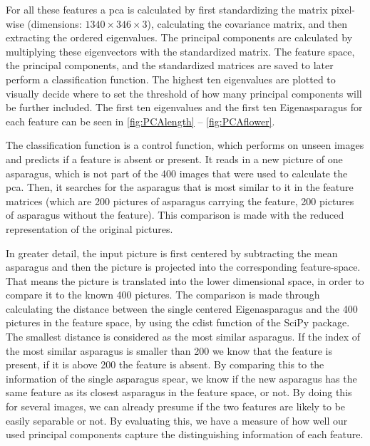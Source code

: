 
\bigskip
For all these features a \acrshort{pca} is calculated by first standardizing the matrix pixel-wise (dimensions: $1340\times346\times3$), calculating the covariance matrix, and then extracting the ordered eigenvalues. The principal components are calculated by multiplying these eigenvectors with the standardized matrix. The feature space, the principal components, and the standardized matrices are saved to later perform a classification function. The highest ten eigenvalues are plotted to visually decide where to set the threshold of how many principal components will be further included. The first ten eigenvalues and the first ten Eigenasparagus for each feature can be seen in \autoref{fig:PCAlength} -- \autoref{fig:PCAflower}.

The classification function is a control function, which performs on unseen images and predicts if a feature is absent or present. It reads in a new picture of one asparagus, which is not part of the 400 images that were used to calculate the \acrshort{pca}. Then, it searches for the asparagus that is most similar to it in the feature matrices (which are 200 pictures of asparagus carrying the feature, 200 pictures of asparagus without the feature). This comparison is made with the reduced representation of the original pictures.

In greater detail, the input picture is first centered by subtracting the mean asparagus and then the picture is projected into the corresponding feature-space. That means the picture is translated into the lower dimensional space, in order to compare it to the known 400 pictures. The comparison is made through calculating the distance between the single centered Eigenasparagus and the 400 pictures in the feature space, by using the cdist function of the SciPy package. The smallest distance is considered as the most similar asparagus. If the index of the most similar asparagus is smaller than 200 we know that the feature is present, if it is above 200 the feature is absent. By comparing this to the information of the single asparagus spear, we know if the new asparagus has the same feature as its closest asparagus in the feature space, or not. By doing this for several images, we can already presume if the two features are likely to be easily separable or not. By evaluating this, we have a measure of how well our used principal components capture the distinguishing information of each feature.


